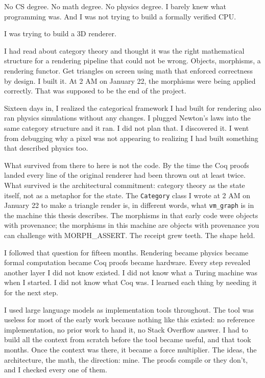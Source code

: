 \documentclass[11pt,a4paper]{article}
\theoremstyle{plain}
\theoremstyle{definition}
\theoremstyle{remark}
\begin{document}
No CS degree. No math degree. No physics degree. I barely knew what programming was. And I was not trying to build a formally verified CPU.

I was trying to build a 3D renderer.

I had read about category theory and thought it was the right mathematical structure for a rendering pipeline that could not be wrong. Objects, morphisms, a rendering functor. Get triangles on screen using math that enforced correctness by design. I built it. At 2 AM on January 22, the morphisms were being applied correctly. That was supposed to be the end of the project.

Sixteen days in, I realized the categorical framework I had built for rendering also ran physics simulations without any changes. I plugged Newton's laws into the same category structure and it ran. I did not plan that. I discovered it. I went from debugging why a pixel was not appearing to realizing I had built something that described physics too.

What survived from there to here is not the code. By the time the Coq proofs landed every line of the original renderer had been thrown out at least twice. What survived is the architectural commitment: category theory as the state itself, not as a metaphor for the state. The \texttt{Category} class I wrote at 2 AM on January 22 to make a triangle render is, in different words, what \texttt{vm\_graph} is in the machine this thesis describes. The morphisms in that early code were objects with provenance; the morphisms in this machine are objects with provenance you can challenge with MORPH\_ASSERT. The receipt grew teeth. The shape held.

I followed that question for fifteen months. Rendering became physics became formal computation became Coq proofs became hardware. Every step revealed another layer I did not know existed. I did not know what a Turing machine was when I started. I did not know what Coq was. I learned each thing by needing it for the next step.

I used large language models as implementation tools throughout. The tool was useless for most of the early work because nothing like this existed: no reference implementation, no prior work to hand it, no Stack Overflow answer. I had to build all the context from scratch before the tool became useful, and that took months. Once the context was there, it became a force multiplier. The ideas, the architecture, the math, the direction: mine. The proofs compile or they don't, and I checked every one of them.
\end{document}
